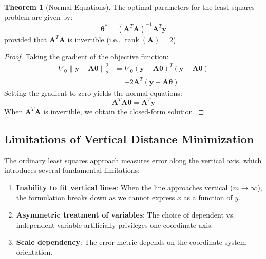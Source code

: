 \documentclass[12pt]{article}
\DeclareMathOperator{\rank}{rank}
\renewcommand{\vec}[1]{\mathbf{#1}}
\newcommand{\norm}[1]{\left\lVert #1 \right\rVert}
\theoremstyle{definition}
\newtheorem{theorem}{Theorem}[section]
\begin{document}
\begin{theorem}[Normal Equations]
    The optimal parameters for the least squares problem are given by:
    \begin{equation}
        \vec{\theta}^* = (\vec{A}^T\vec{A})^{-1}\vec{A}^T\vec{y}
    \end{equation}
    provided that $\vec{A}^T\vec{A}$ is invertible (i.e., $\rank(\vec{A}) = 2$).
\end{theorem}

\begin{proof}
    Taking the gradient of the objective function:
    \begin{align}
        \nabla_{\vec{\theta}} \norm{\vec{y} - \vec{A}\vec{\theta}}_2^2 & = \nabla_{\vec{\theta}} (\vec{y} - \vec{A}\vec{\theta})^T(\vec{y} - \vec{A}\vec{\theta}) \\
                                                                       & = -2\vec{A}^T(\vec{y} - \vec{A}\vec{\theta})
    \end{align}
    Setting the gradient to zero yields the normal equations:
    \begin{equation}
        \vec{A}^T\vec{A}\vec{\theta} = \vec{A}^T\vec{y}
    \end{equation}
    When $\vec{A}^T\vec{A}$ is invertible, we obtain the closed-form solution.
\end{proof}

\subsection{Limitations of Vertical Distance Minimization}

The ordinary least squares approach measures error along the vertical axis, which introduces several fundamental limitations:

\begin{enumerate}
    \item \textbf{Inability to fit vertical lines}: When the line approaches vertical ($m \to \infty$), the formulation breaks down as we cannot express $x$ as a function of $y$.

    \item \textbf{Asymmetric treatment of variables}: The choice of dependent vs. independent variable artificially privileges one coordinate axis.

    \item \textbf{Scale dependency}: The error metric depends on the coordinate system orientation.
\end{enumerate}
\end{document}

